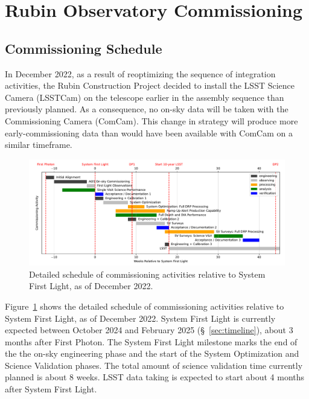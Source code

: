 \section{Rubin Observatory Commissioning}
\label{sec:commissioning}

\subsection{Commissioning Schedule}
\label{ssec:commissioning-schedule}

In December 2022, as a result of reoptimizing the sequence of integration activities, the Rubin Construction Project decided to install the LSST Science Camera (LSSTCam) on the telescope earlier in the assembly sequence than previously planned. 
As a consequence, no on-sky data will be taken with the Commissioning Camera (ComCam). 
This change in strategy will produce more early-commissioning data than would have been available with ComCam on a similar timeframe. 

\begin{figure}[htb]
\centering
\includegraphics[width=0.95\linewidth]{figures/rubinobs_on-sky_commissioning_gantt.pdf}
\caption{Detailed schedule of commissioning activities relative to System First Light, as of December 2022.}
\label{fig:commissioning-gantt}
\end{figure}

Figure~\ref{fig:commissioning-gantt} shows the detailed schedule of commissioning activities relative to System First Light, as of December 2022.
System First Light is currently expected between October 2024 and February 2025 (\S~\ref{sec:timeline}), about 3 months after First Photon. 
The System First Light milestone marks the end of the the on-sky engineering phase and the start of the System Optimization and Science Validation phases. 
The total amount of science validation time currently planned is about 8 weeks.  
LSST data taking is expected to start about 4 months after System First Light.

